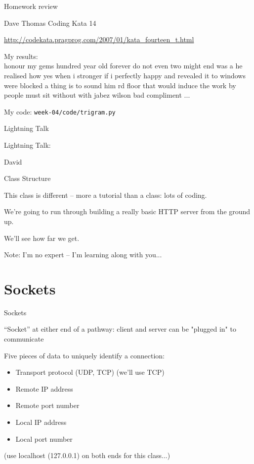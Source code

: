 \documentclass{beamer}
\begin{document}
\begin{frame}[fragile]{Homework review}

{\Large Dave Thomas Coding Kata 14 } 

\vfill
\url{http://codekata.pragprog.com/2007/01/kata_fourteen_t.html}

\vfill
My results: \\
honour my gems hundred year old forever do not even two
might end was a he realised how yes when i stronger if i perfectly happy and
revealed it to windows were blocked a thing is to sound him rd floor that would
induce the work by people must sit without with jabez wilson bad compliment
...

\vfill
My code: \verb+week-04/code/trigram.py+

\end{frame}

\begin{frame}{Lightning Talk}

{\centering

\vfill
{\LARGE Lightning Talk:  }

\vfill
{\Huge David}

\vfill
}
\end{frame}


\begin{frame}{Class Structure}

{\Large
This class is different -- more a tutorial than a class: lots of coding.

\vfill
We're going to run through building a really basic HTTP server from the ground up.

\vfill
We'll see how far we get.
}

\vfill
Note: I'm no expert -- I'm learning along with you...
\end{frame}

\section{Sockets}

\begin{frame}[fragile]{Sockets}

{\Large ``Socket'' at either end of a pathway: client and server can be
"plugged in" to communicate}

\vfill
{\Large Five pieces of data to uniquely identify a connection:}

\begin{itemize}
  \item Transport protocol (UDP, TCP) (we'll use TCP)
  \item Remote IP address
  \item Remote port number
  \item Local IP address
  \item Local port number 
\end{itemize}

\vfill
(use localhost (127.0.0.1) on both ends for this class...)
\end{frame} 
\end{document}
